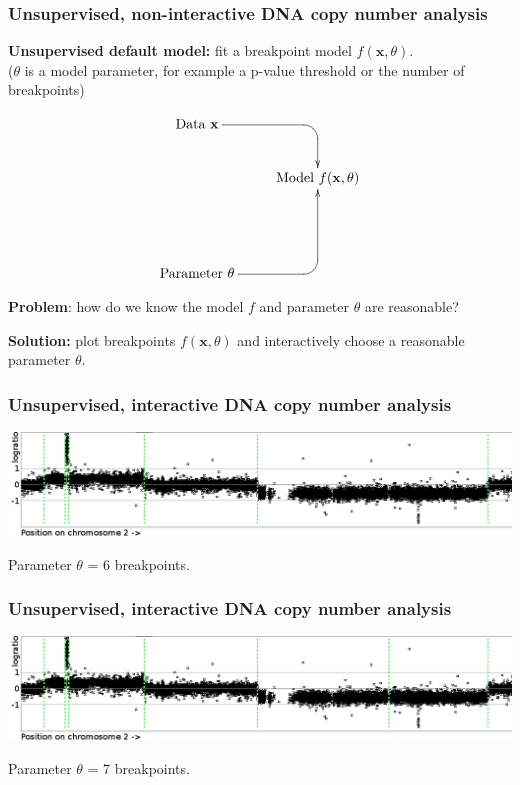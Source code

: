 \documentclass{beamer}
\begin{document}
\begin{frame}
  \frametitle{Unsupervised, non-interactive DNA copy number analysis}

  \textbf{Unsupervised default model:} 
  fit a breakpoint model $f(\mathbf x, \theta)$.\\
  ($\theta$ is a model parameter, for example a p-value threshold or
  the number of breakpoints)

  \begin{displaymath}
  \xymatrix{
    \text{Data $\mathbf x$}
    \ar `[r] [dr] 
    & \text{ }
    \\
    & 
    \text{Model $f(\mathbf x, \theta)$} 
    \\
    \\
    \text{Parameter $\theta$} 
    \ar `r[ruu] [ruu]
    & \text{ }
  }
  \end{displaymath}
  
  \textbf{Problem}: how do we know the model $f$ and parameter
  $\theta$ are reasonable?

  \vskip 0.1in

  \textbf{Solution:} plot breakpoints $f(\mathbf x, \theta)$ and
  interactively choose a reasonable parameter $\theta$.
\end{frame}

\begin{frame}
  \frametitle{Unsupervised, interactive DNA copy number analysis}
  \includegraphics[width=\textwidth]{unlabeled-breakpoints-6}

  Parameter $\theta$ = 6 breakpoints.
\end{frame}

\begin{frame}
  \frametitle{Unsupervised, interactive DNA copy number analysis}
  \includegraphics[width=\textwidth]{unlabeled-breakpoints-7}

  Parameter $\theta$ = 7 breakpoints.
\end{frame}
\end{document}
